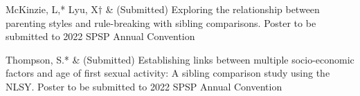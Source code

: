 
\item McKinzie, L,* Lyu, X$\dagger$ \& \meb (Submitted) Exploring the relationship between parenting styles and rule-breaking with sibling comparisons. Poster to be submitted to 2022 SPSP Annual Convention
\item Thompson, S.* \& \meb (Submitted) Establishing links between multiple socio-economic factors and age of first sexual activity: A sibling comparison study using the NLSY. Poster to be submitted to 2022 SPSP Annual Convention
